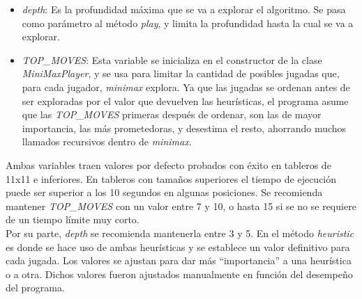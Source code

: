 \documentclass[spanish]{article}
\begin{document}
\begin{itemize}
    \item \textit{depth}: Es la profundidad m\'axima que se va a explorar el algoritmo. Se pasa como par\'ametro al m\'etodo \textit{play}, y limita la profundidad hasta la cual se va a explorar.
    \item \textit{TOP\_MOVES}: Esta variable se inicializa en el constructor de la clase \textit{MiniMaxPlayer}, y se usa para limitar la cantidad de posibles jugadas que, para cada jugador, \textit{minimax} explora. Ya que las jugadas se ordenan antes de ser exploradas por el valor que devuelven las heur\'isticas, el programa asume que las \textit{TOP\_MOVES} primeras despu\'es de ordenar, son las de mayor importancia, las m\'as prometedoras, y desestima el resto, ahorrando muchos llamados recursivos dentro de \textit{minimax}.
\end{itemize}
Ambas variables traen valores por defecto probados con \'exito en tableros de 11x11 e inferiores. En tableros con tama\~nos superiores el tiempo de ejecuci\'on puede ser superior a los 10 segundos en algunas posiciones. Se recomienda mantener \textit{TOP\_MOVES} con un valor entre 7 y 10, o hasta 15 si se no se requiere de un tiempo l\'imite muy corto.\\
Por su parte, \textit{depth} se recomienda mantenerla entre 3 y 5. En el m\'etodo \textit{heuristic} es donde se hace uso de ambas heur\'isticas y se establece un valor definitivo para cada jugada. Los valores se ajustan para dar m\'as ``importancia'' a una heur\'istica o a otra. Dichos valores fueron ajustados manualmente en funci\'on del desempe\~no del programa.
\end{document}
